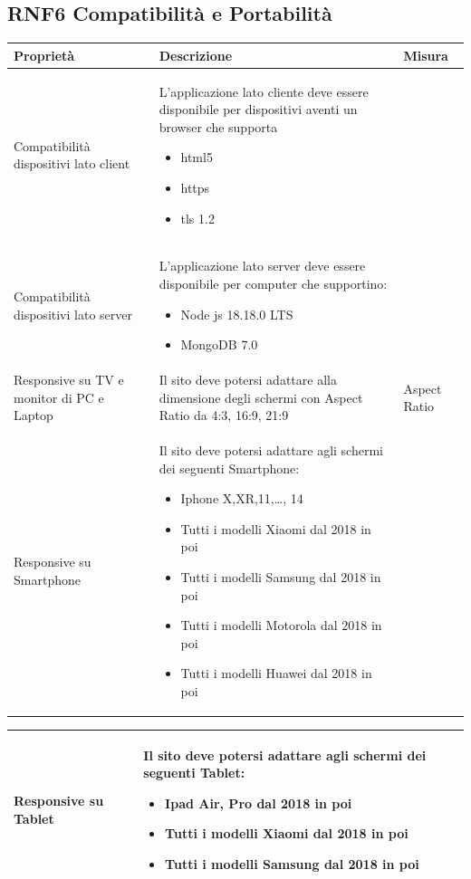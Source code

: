 \documentclass{report}
\begin{document}
\subsection*{RNF6 Compatibilità e Portabilità}
\begin{center} %
	\centering
	\begin{tabular}{ |p{3cm}|p{4cm}|p{4cm}|  }
		\hline
		\centering Proprietà & \qquad\quad Descrizione & \qquad\qquad Misura\\ %
		\hline
		Compatibilità dispositivi lato client & L'applicazione lato cliente  deve essere disponibile per dispositivi aventi un browser che supporta \begin{itemize}
		\item html5
		\item https
		\item tls 1.2
		\end{itemize} & \\
		\hline
		Compatibilità dispositivi lato server & L'applicazione lato server deve essere disponibile per computer che supportino: 
		\begin{itemize}
			\item Node js 18.18.0 LTS
			\item MongoDB 7.0
		\end{itemize}
		& \\
		\hline 
		Responsive su TV e monitor di PC e Laptop & Il sito deve potersi adattare alla dimensione degli schermi con Aspect Ratio da 4:3, 16:9, 21:9 & Aspect Ratio \\
		\hline
		Responsive su Smartphone & Il sito deve potersi adattare agli schermi dei seguenti Smartphone: 
		\begin{itemize}
			\item Iphone X,XR,11,\dots , 14
			\item Tutti i modelli Xiaomi dal 2018 in poi 
			\item Tutti i modelli Samsung dal 2018 in poi
			\item Tutti i modelli Motorola dal 2018 in poi 
			\item Tutti i modelli Huawei dal 2018 in poi 
		\end{itemize}
		& \\
		
		\hline
		
	\end{tabular}
\end{center}
\begin{center} %
	\centering
	\begin{tabular}{ |p{3cm}|p{4cm}|p{4cm}|  }
		\hline
		Responsive su Tablet & Il sito deve potersi adattare agli schermi dei seguenti Tablet: 
		\begin{itemize}
			\item Ipad Air, Pro dal 2018 in poi
			\item Tutti i modelli Xiaomi dal 2018 in poi
			\item Tutti i modelli Samsung dal 2018 in poi
		\end{itemize} & \\
		\hline
		
		
	\end{tabular}
\end{center}
\end{document}
